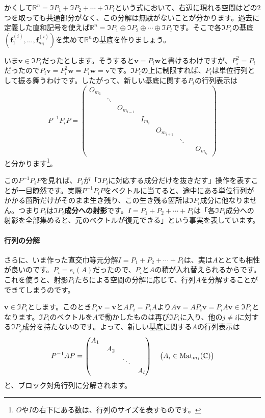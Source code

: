 かくして$\mathbb{R}^n = \Im P_1 + \Im P_2 + \cdots + \Im P_l$という式において、右辺に現れる空間はどの$2$つを取っても共通部分がなく、この分解は無駄がないことが分かります。過去に定義した直和記号を使えば$\mathbb{R}^n = \Im P_1 \oplus \Im P_2 \oplus \cdots \oplus \Im P_l$です。そこで各$\Im P_i$の基底$(\bm{f}^{(i)}_1, \ldots, \bm{f}^{(i)}_{m_i})$を集めて$\mathbb{R}^n$の基底を作りましょう。

いま$\bm{v} \in \Im P_i$だったとします。そうすると$\bm{v} = P_i \bm{w}$と書けるわけですが、$P_i^2 = P_i$だったので$P_i \bm{v} = P_i^2 \bm{w} = P_i \bm{w} = \bm{v}$です。$\Im P_i$の上に制限すれば、$P_i$は単位行列として振る舞うわけです。したがって、新しい基底に関する$P_i$の行列表示は
\[
P^{-1} P_i P =
\begin{pmatrix}
O_{m_1} \\
& \ddots \\
& & O_{m_{i - 1}} \\
& & & I_{m_i} \\
& & & & O_{m_{i + 1}} \\
& & & & & \ddots \\
& & & & & & & O_{m_{i_l}}
\end{pmatrix}
\]
と分かります\footnote{$O$や$I$の右下にある数は、行列のサイズを表すものです。}。

この$P^{-1} P_i P$を見れば、$P_i$が「$\Im P_i$に対応する成分だけを抜きだす」操作を表すことが一目瞭然です。実際$P^{-1} P_i P$をベクトルに当てると、途中にある単位行列がかかる箇所だけがそのまま生き残り、この生き残る箇所は$\Im P_i$成分に他なりません。つまり$P_i$は\textbf{$\Im P_i$成分への射影}です。$I = P_1 + P_2 + \cdots + P_l$は「各$\Im P_i$成分への射影を全部集めると、元のベクトルが復元できる」という事実を表しています。

\paragraph{行列の分解}

さらに、いま作った直交巾等元分解$I = P_1 + P_2 + \cdots + P_l$は、実は$A$ととても相性が良いのです。$P_i = e_i(A)$だったので、$P_i$と$A$の積が入れ替えられるからです。これを使うと、射影$P_i$たちによる空間の分解に応じて、行列$A$を分解することができてしまうのです。

$\bm{v} \in \Im P_i$とします。このとき$P_i \bm{v} = \bm{v}$と$A P_i = P_i A$より$A \bm{v} = A P_i \bm{v} = P_i A \bm{v} \in \Im P_i$となります。$\Im P_i$のベクトルを$A$で動かしたものは再び$\Im P_i$に入り、他の$j \neq i$に対する$\Im P_j$成分を持たないのです。よって、新しい基底に関する$A$の行列表示は
\[
P^{-1} A P = 
\begin{pmatrix}
A_1 \\
& A_2 \\
& & \ddots \\
& & & A_l
\end{pmatrix}
\quad \bigl(A_i \in \operatorname{Mat}_{m_i}(\mathbb{C})\bigr)
\]
と、ブロック対角行列に分解されます。%

